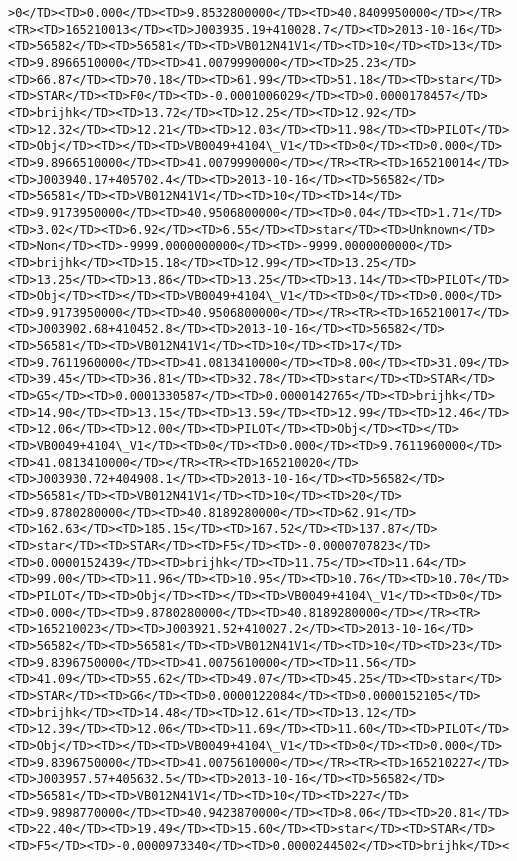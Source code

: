 \documentclass[11pt]{article}
\begin{document}
\begin{Verbatim}[commandchars=\\\{\}]
>0</TD><TD>0.000</TD><TD>9.8532800000</TD><TD>40.8409950000</TD></TR><TR><TD>165210013</TD><TD>J003935.19+410028.7</TD><TD>2013-10-16</TD><TD>56582</TD><TD>56581</TD><TD>VB012N41V1</TD><TD>10</TD><TD>13</TD><TD>9.8966510000</TD><TD>41.0079990000</TD><TD>25.23</TD><TD>66.87</TD><TD>70.18</TD><TD>61.99</TD><TD>51.18</TD><TD>star</TD><TD>STAR</TD><TD>F0</TD><TD>-0.0001006029</TD><TD>0.0000178457</TD><TD>brijhk</TD><TD>13.72</TD><TD>12.25</TD><TD>12.92</TD><TD>12.32</TD><TD>12.21</TD><TD>12.03</TD><TD>11.98</TD><TD>PILOT</TD><TD>Obj</TD><TD></TD><TD>VB0049+4104\_V1</TD><TD>0</TD><TD>0.000</TD><TD>9.8966510000</TD><TD>41.0079990000</TD></TR><TR><TD>165210014</TD><TD>J003940.17+405702.4</TD><TD>2013-10-16</TD><TD>56582</TD><TD>56581</TD><TD>VB012N41V1</TD><TD>10</TD><TD>14</TD><TD>9.9173950000</TD><TD>40.9506800000</TD><TD>0.04</TD><TD>1.71</TD><TD>3.02</TD><TD>6.92</TD><TD>6.55</TD><TD>star</TD><TD>Unknown</TD><TD>Non</TD><TD>-9999.0000000000</TD><TD>-9999.0000000000</TD><TD>brijhk</TD><TD>15.18</TD><TD>12.99</TD><TD>13.25</TD><TD>13.25</TD><TD>13.86</TD><TD>13.25</TD><TD>13.14</TD><TD>PILOT</TD><TD>Obj</TD><TD></TD><TD>VB0049+4104\_V1</TD><TD>0</TD><TD>0.000</TD><TD>9.9173950000</TD><TD>40.9506800000</TD></TR><TR><TD>165210017</TD><TD>J003902.68+410452.8</TD><TD>2013-10-16</TD><TD>56582</TD><TD>56581</TD><TD>VB012N41V1</TD><TD>10</TD><TD>17</TD><TD>9.7611960000</TD><TD>41.0813410000</TD><TD>8.00</TD><TD>31.09</TD><TD>39.45</TD><TD>36.81</TD><TD>32.78</TD><TD>star</TD><TD>STAR</TD><TD>G5</TD><TD>0.0001330587</TD><TD>0.0000142765</TD><TD>brijhk</TD><TD>14.90</TD><TD>13.15</TD><TD>13.59</TD><TD>12.99</TD><TD>12.46</TD><TD>12.06</TD><TD>12.00</TD><TD>PILOT</TD><TD>Obj</TD><TD></TD><TD>VB0049+4104\_V1</TD><TD>0</TD><TD>0.000</TD><TD>9.7611960000</TD><TD>41.0813410000</TD></TR><TR><TD>165210020</TD><TD>J003930.72+404908.1</TD><TD>2013-10-16</TD><TD>56582</TD><TD>56581</TD><TD>VB012N41V1</TD><TD>10</TD><TD>20</TD><TD>9.8780280000</TD><TD>40.8189280000</TD><TD>62.91</TD><TD>162.63</TD><TD>185.15</TD><TD>167.52</TD><TD>137.87</TD><TD>star</TD><TD>STAR</TD><TD>F5</TD><TD>-0.0000707823</TD><TD>0.0000152439</TD><TD>brijhk</TD><TD>11.75</TD><TD>11.64</TD><TD>99.00</TD><TD>11.96</TD><TD>10.95</TD><TD>10.76</TD><TD>10.70</TD><TD>PILOT</TD><TD>Obj</TD><TD></TD><TD>VB0049+4104\_V1</TD><TD>0</TD><TD>0.000</TD><TD>9.8780280000</TD><TD>40.8189280000</TD></TR><TR><TD>165210023</TD><TD>J003921.52+410027.2</TD><TD>2013-10-16</TD><TD>56582</TD><TD>56581</TD><TD>VB012N41V1</TD><TD>10</TD><TD>23</TD><TD>9.8396750000</TD><TD>41.0075610000</TD><TD>11.56</TD><TD>41.09</TD><TD>55.62</TD><TD>49.07</TD><TD>45.25</TD><TD>star</TD><TD>STAR</TD><TD>G6</TD><TD>0.0000122084</TD><TD>0.0000152105</TD><TD>brijhk</TD><TD>14.48</TD><TD>12.61</TD><TD>13.12</TD><TD>12.39</TD><TD>12.06</TD><TD>11.69</TD><TD>11.60</TD><TD>PILOT</TD><TD>Obj</TD><TD></TD><TD>VB0049+4104\_V1</TD><TD>0</TD><TD>0.000</TD><TD>9.8396750000</TD><TD>41.0075610000</TD></TR><TR><TD>165210227</TD><TD>J003957.57+405632.5</TD><TD>2013-10-16</TD><TD>56582</TD><TD>56581</TD><TD>VB012N41V1</TD><TD>10</TD><TD>227</TD><TD>9.9898770000</TD><TD>40.9423870000</TD><TD>8.06</TD><TD>20.81</TD><TD>22.40</TD><TD>19.49</TD><TD>15.60</TD><TD>star</TD><TD>STAR</TD><TD>F5</TD><TD>-0.0000973340</TD><TD>0.0000244502</TD><TD>brijhk</TD><
\end{Verbatim}
\end{document}
